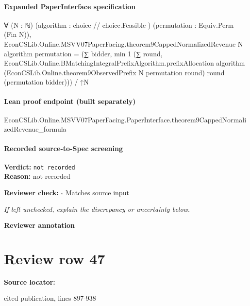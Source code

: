 \documentclass[10pt]{article}
\newcommand{\reviewerbox}{%
  \par\noindent\fbox{\parbox{0.96\linewidth}{\rule{0pt}{0.38in}}}\par
}
\newcommand{\reviewmatch}[1]{%
  \par\noindent\textbf{Reviewer check:} $\square$\; #1\par
  \noindent\emph{If left unchecked, explain the discrepancy or uncertainty below.}\par
}
\begin{document}
\paragraph{Expanded PaperInterface specification}
\begin{ReviewVerbatim}
∀ (N : ℕ) (algorithm : { choice // choice.Feasible }) (permutation : Equiv.Perm (Fin N)),
  EconCSLib.Online.MSVV07PaperFacing.theorem9CappedNormalizedRevenue N algorithm permutation =
    (∑ bidder,
        min 1
          (∑ round,
            EconCSLib.Online.BMatchingIntegralPrefixAlgorithm.prefixAllocation algorithm
              (EconCSLib.Online.theorem9ObservedPrefix N permutation round) round (permutation bidder))) /
      ↑N
\end{ReviewVerbatim}

\paragraph{Lean proof endpoint (built separately)}\begin{ReviewVerbatim}
EconCSLib.Online.MSVV07PaperFacing.PaperInterface.theorem9CappedNormalizedRevenue_formula
\end{ReviewVerbatim}

\paragraph{Recorded source-to-Spec screening}
\textbf{Verdict:} \texttt{not recorded}
\\
\textbf{Reason:} not recorded
\reviewmatch{Matches source input}
\noindent\textbf{Reviewer annotation}\par
\reviewerbox
\clearpage
\hypertarget{source-claim-5b0fcfe8e1bd2a2c}{}
\section*{Review row 47}
\textbf{Source locator:} {\footnotesize\raggedright cited publication, lines 897-\allowbreak{}938\par}
\end{document}
